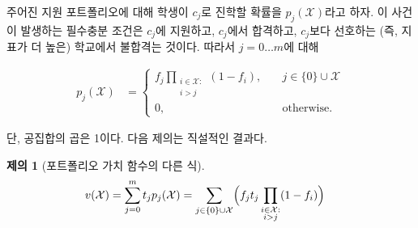 \documentclass[11pt]{article} %
\newif\ifen
\newtheorem{proposition}{Proposition}
\theoremstyle{definition}
\newtheorem{proposition}{제의}
\theoremstyle{definition}
\begin{document}
\ifen
Given an application portfolio, let $p_j(\mathcal{X})$ denote the probability that the student attends $c_j$. This occurs if and only if she \emph{applies} to $c_j$, is \emph{admitted} to $c_j$, and is \emph{rejected} from any school she prefers to $c_j$; that is, any school with higher index. Hence, for $j= 0\dots m$,
\else
주어진 지원 포트폴리오에 대해 학생이 $c_j$로 진학할 확률을 $p_j(\mathcal{X})$라고 하자. 이 사건이 발생하는 필수충분 조건은 $c_j$에 지원하고, $c_j$에서 합격하고, $c_j$보다 선호하는 (즉, 지표가 더 높은) 학교에서 불합격는 것이다. 따라서  $j= 0\dots m$에 대해
\fi
\begin{align}
p_j(\mathcal{X}) &= 
\begin{cases}
\displaystyle f_j  \prod_{\substack{i \in \mathcal{X}: \\ i > j}} (1 - f_{i}), \quad & j \in \{0\}\cup\mathcal{X}\\
0, \quad & \text{\ifen otherwise\else otherwise.\fi}
\end{cases} 
\end{align}
\ifen
where the empty product equals one. The following proposition follows immediately.
\else
단, 공집합의 곱은 1이다. 다음 제의는 직설적인 결과다.
\fi

\begin{proposition}[\ifen Closed form of portfolio valuation function\else 포트폴리오 가치 함수의 다른 식\fi]
\begin{align}
v(\mathcal{X}) &= \sum_{j=0}^m t_j p_j(\mathcal{X}) = \sum_{j\in\{0\}\cup\mathcal{X}} \Bigl( f_j t_j \prod_{\substack{i \in \mathcal{X}: \\ i > j}} (1 - f_{i}) \Bigr)  \label{closedformportfoliovaluationX}%
\end{align}
\end{proposition}
\end{document}
